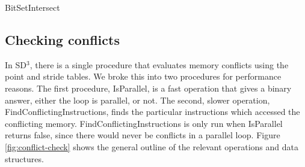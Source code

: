 \documentclass[12pt,twoside]{reedthesis}
\begin{document}
			
			\begin{algorithm}
				\caption{BitSetIntersect}
				\label{bitsetintersect}
				\begin{algorithmic}[1]
					\Else
					\EndIf
					\EndFor
					
					\EndFunction
				\end{algorithmic}
			\end{algorithm}
		
		\subsection{Checking conflicts}
			
			In SD$^3$, there is a single procedure that evaluates memory conflicts using the point and stride tables. We broke this into two procedures for performance reasons.  The first procedure, IsParallel, is a fast operation that gives a binary answer, either the loop is parallel, or not. The second, slower operation, FindConflictingInstructions, finds the particular instructions which accessed the conflicting memory. FindConflictingInstructions is only run when IsParallel returns false, since there would never be conflicts in a parallel loop. Figure \ref{fig:conflict-check} shows the general outline of the relevant operations and data structures.
			
\end{document}
